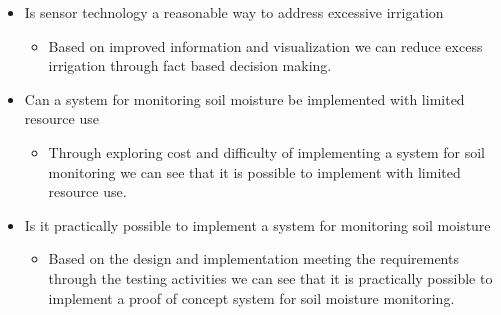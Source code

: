 \documentclass[]{uiophd}
\begin{document}
\begin{itemize}
  \item Is sensor technology a reasonable way to address excessive irrigation
  \begin{itemize}
  \item Based on improved information and visualization we can reduce excess irrigation through fact based decision making.
  \end{itemize}
  
  \item Can a system for monitoring soil moisture be implemented with limited resource use
    \begin{itemize}
  \item Through exploring cost and difficulty of implementing a system for soil monitoring we can see that it is possible to implement with limited resource use.
  \end{itemize}
  
  \item Is it practically possible to implement a system for monitoring soil moisture 
    \begin{itemize}
  \item Based on the design and implementation meeting the requirements through the testing activities we can see that it is practically possible to implement a proof of concept system for soil moisture monitoring.
  \end{itemize}
  
\end{itemize}
\end{document}
